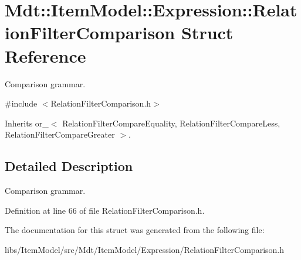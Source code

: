 \hypertarget{struct_mdt_1_1_item_model_1_1_expression_1_1_relation_filter_comparison}{}\section{Mdt\+:\+:Item\+Model\+:\+:Expression\+:\+:Relation\+Filter\+Comparison Struct Reference}
\label{struct_mdt_1_1_item_model_1_1_expression_1_1_relation_filter_comparison}


Comparison grammar.  




{\ttfamily \#include $<$Relation\+Filter\+Comparison.\+h$>$}



Inherits or\+\_\+$<$ Relation\+Filter\+Compare\+Equality, Relation\+Filter\+Compare\+Less, Relation\+Filter\+Compare\+Greater $>$.



\subsection{Detailed Description}
Comparison grammar. 

Definition at line 66 of file Relation\+Filter\+Comparison.\+h.



The documentation for this struct was generated from the following file\+:\begin{DoxyCompactItemize}
\item 
libs/\+Item\+Model/src/\+Mdt/\+Item\+Model/\+Expression/Relation\+Filter\+Comparison.\+h\end{DoxyCompactItemize}
